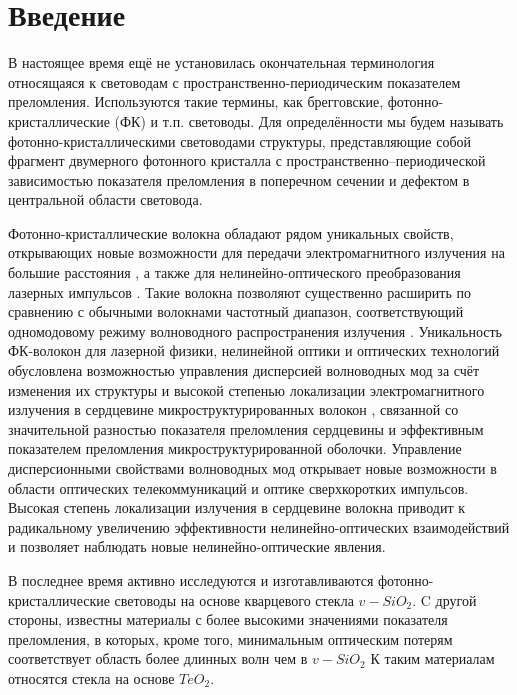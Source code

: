 \clearpage %
\section*{Введение}
В настоящее время ещё не установилась окончательная терминология относящаяся к световодам
с пространственно-периодическим показателем преломления. Используются такие термины, как
брегговские, фотонно-кристаллические (ФК) и т.п. световоды. Для определённости мы будем называть
фотонно-кристаллическими световодами структуры, представляющие собой фрагмент
двумерного фотонного кристалла с пространственно--периодической зависимостью показателя преломления
в поперечном сечении и дефектом в центральной области световода.

Фотонно-кристаллические волокна обладают рядом уникальных свойств, открывающих новые
возможности для передачи электромагнитного излучения на большие расстояния \cite{Knight, Russell},
а также для нелинейно-оптического преобразования лазерных импульсов \cite{Bowden, Ivanov, Zheltikov}.
Такие волокна позволяют существенно расширить по сравнению с обычными волокнами частотный диапазон,
соответствующий одномодовому режиму волноводного распространения излучения \cite{Bowden}.
Уникальность ФК-волокон для лазерной физики, нелинейной оптики и оптических технологий обусловлена
возможностью управления дисперсией волноводных мод за счёт изменения их структуры \cite{Reeves}
и высокой степенью локализации электромагнитного излучения в сердцевине микроструктурированных
волокон \cite{Fedotov}, связанной со значительной разностью показателя преломления сердцевины
и эффективным показателем преломления микроструктурированной оболочки. Управление
дисперсионными свойствами волноводных мод открывает новые возможности в области оптических
телекоммуникаций и оптике сверхкоротких импульсов. Высокая степень локализации излучения в
сердцевине волокна приводит к радикальному увеличению эффективности нелинейно-оптических
взаимодействий и позволяет наблюдать новые нелинейно-оптические явления.

В последнее время активно исследуются и изготавливаются фотонно-кристаллические световоды на основе кварцевого стекла $v-SiO_2$.
C другой стороны, известны материалы с более высокими значениями показателя преломления,
в которых, кроме того, минимальным оптическим потерям соответствует область более длинных волн чем
в $v-SiO_2$ К таким материалам относятся стекла на основе $TeO_2$.

